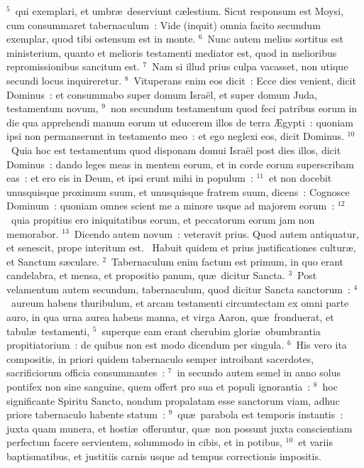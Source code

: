 ${}^{5}$~qui exemplari, et umbr\ae\ deserviunt c\ae lestium. Sicut responsum est Moysi, cum consummaret tabernaculum~: Vide (inquit) omnia facito secundum exemplar, quod tibi ostensum est in monte.
${}^{6}$~Nunc autem melius sortitus est ministerium, quanto et melioris testamenti mediator est, quod in melioribus repromissionibus sancitum est.
${}^{7}$~Nam si illud prius culpa vacasset, non utique secundi locus inquireretur.
${}^{8}$~Vituperans enim eos dicit~: Ecce dies venient, dicit Dominus~: et consummabo super domum Isra\"el, et super domum Juda, testamentum novum,
${}^{9}$~non secundum testamentum quod feci patribus eorum in die qua apprehendi manum eorum ut educerem illos de terra \AE gypti~: quoniam ipsi non permanserunt in testamento meo~: et ego neglexi eos, dicit Dominus.
${}^{10}$~Quia hoc est testamentum quod disponam domui Isra\"el post dies illos, dicit Dominus~: dando leges meas in mentem eorum, et in corde eorum superscribam eas~: et ero eis in Deum, et ipsi erunt mihi in populum~:
${}^{11}$~et non docebit unusquisque proximum suum, et unusquisque fratrem suum, dicens~: Cognosce Dominum~: quoniam omnes scient me a minore usque ad majorem eorum~:
${}^{12}$~quia propitius ero iniquitatibus eorum, et peccatorum eorum jam non memorabor.
${}^{13}$~Dicendo autem novum~: veteravit prius. Quod autem antiquatur, et senescit, prope interitum est.
~Habuit quidem et prius justificationes cultur\ae , et Sanctum s\ae culare.
${}^{2}$~Tabernaculum enim factum est primum, in quo erant candelabra, et mensa, et propositio panum, qu\ae\ dicitur Sancta.
${}^{3}$~Post velamentum autem secundum, tabernaculum, quod dicitur Sancta sanctorum~:
${}^{4}$~aureum habens thuribulum, et arcam testamenti circumtectam ex omni parte auro, in qua urna aurea habens manna, et virga Aaron, qu\ae\ fronduerat, et tabul\ae\ testamenti,
${}^{5}$~superque eam erant cherubim glori\ae\ obumbrantia propitiatorium~: de quibus non est modo dicendum per singula.
${}^{6}$~His vero ita compositis, in priori quidem tabernaculo semper introibant sacerdotes, sacrificiorum officia consummantes~:
${}^{7}$~in secundo autem semel in anno solus pontifex non sine sanguine, quem offert pro sua et populi ignorantia~:
${}^{8}$~hoc significante Spiritu Sancto, nondum propalatam esse sanctorum viam, adhuc priore tabernaculo habente statum~:
${}^{9}$~qu\ae\ parabola est temporis instantis~: juxta quam munera, et hosti\ae\ offeruntur, qu\ae\ non possunt juxta conscientiam perfectum facere servientem, solummodo in cibis, et in potibus,
${}^{10}$~et variis baptismatibus, et justitiis carnis usque ad tempus correctionis impositis.


